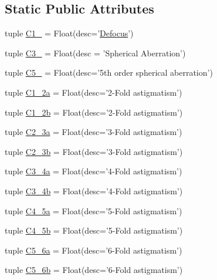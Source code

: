 \subsection*{Static Public Attributes}
\begin{DoxyCompactItemize}
\item 
tuple \hyperlink{classaberrations_1_1_ab_krivanek_a67551c9dcb755773d0d4d68ddddbb0c1}{C1\-\_} = Float(desc='\hyperlink{image_sim_8m_a095451ad095fab975004df8fa1925cb8}{Defocus}')
\item 
tuple \hyperlink{classaberrations_1_1_ab_krivanek_a8660810b2614beb56702878902b594f2}{C3\-\_} = Float(desc = 'Spherical Aberration')
\item 
tuple \hyperlink{classaberrations_1_1_ab_krivanek_aed991b8cfb36ae34e5adbbab09854888}{C5\-\_} = Float(desc='5th order spherical aberration')
\item 
tuple \hyperlink{classaberrations_1_1_ab_krivanek_a6743d32a0185f0c0cb00cb1b4dca36f4}{C1\-\_\-2a} = Float(desc='2-\/Fold astigmatism')
\item 
tuple \hyperlink{classaberrations_1_1_ab_krivanek_a8835ee7c475ae556be69a14a99f733ea}{C1\-\_\-2b} = Float(desc='2-\/Fold astigmatism')
\item 
tuple \hyperlink{classaberrations_1_1_ab_krivanek_ab60aea624cb5d86337e8bd6dfd7ef20f}{C2\-\_\-3a} = Float(desc='3-\/Fold astigmatism')
\item 
tuple \hyperlink{classaberrations_1_1_ab_krivanek_ae1f00d8d6fcc1ec3676653a619bc9466}{C2\-\_\-3b} = Float(desc='3-\/Fold astigmatism')
\item 
tuple \hyperlink{classaberrations_1_1_ab_krivanek_a2d7b8b57cf3aa5d096f859e24dac2e8c}{C3\-\_\-4a} = Float(desc='4-\/Fold astigmatism')
\item 
tuple \hyperlink{classaberrations_1_1_ab_krivanek_a53cdd9582c6e36d5391be28a10193e53}{C3\-\_\-4b} = Float(desc='4-\/Fold astigmatism')
\item 
tuple \hyperlink{classaberrations_1_1_ab_krivanek_a7c6b7ffa2a750e4886d48acc0043e543}{C4\-\_\-5a} = Float(desc='5-\/Fold astigmatism')
\item 
tuple \hyperlink{classaberrations_1_1_ab_krivanek_a4498d2f076a44b05635c92dd234c9940}{C4\-\_\-5b} = Float(desc='5-\/Fold astigmatism')
\item 
tuple \hyperlink{classaberrations_1_1_ab_krivanek_ad0efb21c7be0f06d0d9bf9ef2126edb6}{C5\-\_\-6a} = Float(desc='6-\/Fold astigmatism')
\item 
tuple \hyperlink{classaberrations_1_1_ab_krivanek_a4f142f6028261cce8c2676a4e035a773}{C5\-\_\-6b} = Float(desc='6-\/Fold astigmatism')

\end{DoxyCompactItemize}
